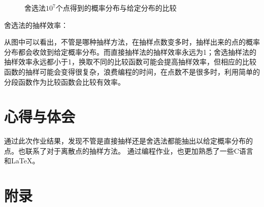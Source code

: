 \documentclass[a4paper,11pt]{article}
\begin{document}
\begin{figure}[!htbp]        
\caption{\label{1} 舍选法$10^{7}$个点得到的概率分布与给定分布的比较}      
\end{figure}

\newpage 舍选法的抽样效率：

\begin{table}[!htbp]
\centering
{}
\caption{抽样效率一览表}
\end{table}

从图中可以看出，不管是哪种抽样方法，在抽样点数变多时，抽样出来的点的概率分布都会收敛到给定概率分布。而直接抽样法的抽样效率永远为1；舍选抽样法的抽样效率永远都小于1，换取不同的比较函数可能会提高抽样效率，但相应的比较函数的抽样可能会变得很复杂，浪费编程的时间，在点数不是很多时，利用简单的分段函数作为比较函数会比较有效率。



\section{心得与体会}
通过此次作业结果，发现不管是直接抽样还是舍选法都能抽出以给定概率分布的点。也联系了对于离散点的抽样方法。
通过编程作业，也更加熟悉了一些C语言和\LaTeX 。

\newpage
\section{附录}
\end{document}
